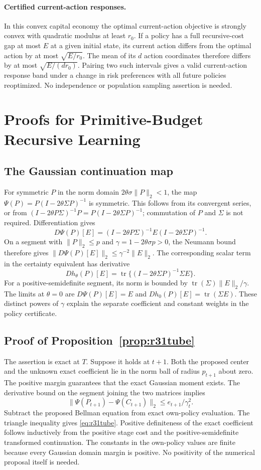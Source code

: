 \documentclass[ecta,nameyear,draft]{econsocart}
\theoremstyle{definition}
\theoremstyle{remark}
\begin{document}
\paragraph{Certified current-action responses.}
In this convex capital economy the optimal current-action objective is
strongly convex with quadratic modulus at least $r_0$.
If a policy has a full recursive-cost gap at most $E$ at a given initial state,
its current action differs from the optimal action by at most $\sqrt{E/r_0}$.
The mean of its $d$ action coordinates therefore differs by at most
$\sqrt{E/(dr_0)}$. Pairing two such intervals gives a valid current-action
response band under a change in risk preferences with all future policies
reoptimized. No independence or population sampling assertion is needed.

\section{Proofs for Primitive-Budget Recursive Learning}\label{sec:r31proofs}
\subsection{The Gaussian continuation map}
For symmetric $P$ in the norm domain $2\theta\sigma\|P\|_2<1$, the map
$\Psi(P)=P(I-2\theta\Sigma P)^{-1}$ is symmetric. This follows from its
convergent series, or from
$(I-2\theta P\Sigma)^{-1}P=P(I-2\theta\Sigma P)^{-1}$;
commutation of $P$ and $\Sigma$ is not required. Differentiation gives
\[
 D\Psi(P)[E]=(I-2\theta P\Sigma)^{-1}
               E(I-2\theta\Sigma P)^{-1}.
\]
On a segment with $\|P\|_2\leq p$ and
$\gamma=1-2\theta\sigma p>0$, the Neumann bound therefore gives
$\|D\Psi(P)[E]\|_2\leq\gamma^{-2}\|E\|_2$.
The corresponding scalar term in the certainty equivalent has derivative
\[
 Dh_\theta(P)[E]=\operatorname{tr}
       \{(I-2\theta\Sigma P)^{-1}\Sigma E\}.
\]
For a positive-semidefinite segment, its norm is bounded by
$\operatorname{tr}(\Sigma)\|E\|_2/\gamma$. The limits at $\theta=0$ are
$D\Psi(P)[E]=E$ and $Dh_0(P)[E]=\operatorname{tr}(\Sigma E)$.
These distinct powers of $\gamma$ explain the separate coefficient and
constant weights in the policy certificate.

\subsection{Proof of Proposition~\ref{prop:r31tube}}
The assertion is exact at $T$. Suppose it holds at $t+1$. Both the proposed
center and the unknown exact coefficient lie in the norm ball of radius
$p_{t+1}$ about zero. The positive margin guarantees that the exact Gaussian
moment exists. The derivative bound on the segment joining the two matrices
implies
\[
 \|\Psi(P_{t+1})-\Psi(C_{t+1})\|_2
                         \leq e_{t+1}/\gamma_t^2.
\]
Subtract the proposed Bellman equation from exact own-policy evaluation.
The triangle inequality gives \eqref{eq:r31tube}. Positive definiteness of
the exact coefficient follows inductively from the positive stage cost and
the positive-semidefinite transformed continuation. The constants in the
own-policy values are finite because every Gaussian domain margin is
positive. No positivity of the numerical proposal itself is needed.
\end{document}
